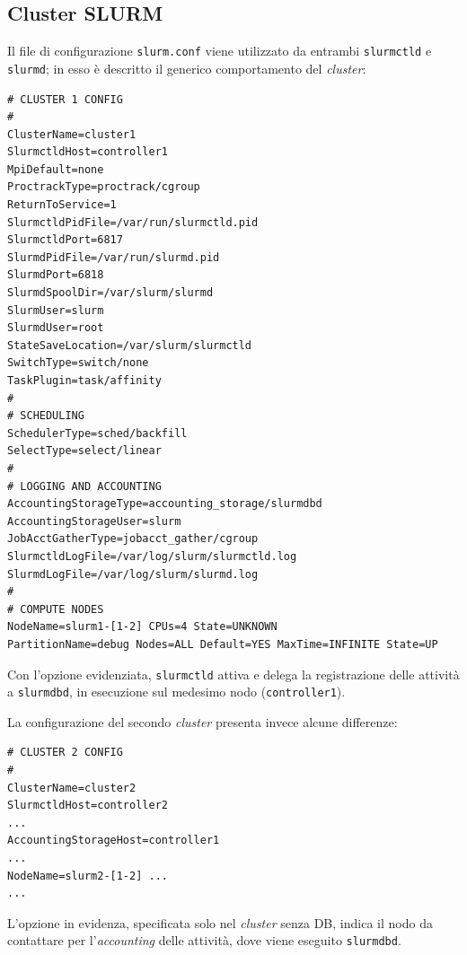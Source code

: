 \documentclass[12pt,a4paper,twoside,openright]{book}
\begin{document}
\subsection{Cluster SLURM}
\label{clusterconf}
Il file di configurazione \texttt{slurm.conf} viene utilizzato da entrambi \texttt{slurmctld} e \texttt{slurmd}; in esso è descritto il generico comportamento del \textit{cluster}:
\begin{verbatim}
# CLUSTER 1 CONFIG
#
ClusterName=cluster1
SlurmctldHost=controller1
MpiDefault=none
ProctrackType=proctrack/cgroup
ReturnToService=1
SlurmctldPidFile=/var/run/slurmctld.pid
SlurmctldPort=6817
SlurmdPidFile=/var/run/slurmd.pid
SlurmdPort=6818
SlurmdSpoolDir=/var/slurm/slurmd
SlurmUser=slurm
SlurmdUser=root
StateSaveLocation=/var/slurm/slurmctld
SwitchType=switch/none
TaskPlugin=task/affinity
#
# SCHEDULING
SchedulerType=sched/backfill
SelectType=select/linear
#
# LOGGING AND ACCOUNTING
AccountingStorageType=accounting_storage/slurmdbd
AccountingStorageUser=slurm
JobAcctGatherType=jobacct_gather/cgroup
SlurmctldLogFile=/var/log/slurm/slurmctld.log
SlurmdLogFile=/var/log/slurm/slurmd.log
#
# COMPUTE NODES
NodeName=slurm1-[1-2] CPUs=4 State=UNKNOWN
PartitionName=debug Nodes=ALL Default=YES MaxTime=INFINITE State=UP
\end{verbatim}
Con l'opzione evidenziata, \texttt{slurmctld} attiva e delega la registrazione delle attività a \texttt{slurmdbd}, in esecuzione sul medesimo nodo (\texttt{controller1}).

La configurazione del secondo \textit{cluster} presenta invece alcune differenze:
\begin{verbatim}
# CLUSTER 2 CONFIG
#
ClusterName=cluster2
SlurmctldHost=controller2
...
AccountingStorageHost=controller1
...
NodeName=slurm2-[1-2] ...
...
\end{verbatim}
L'opzione in evidenza, specificata solo nel \textit{cluster} senza \ac{DB}, indica il nodo da contattare per l'\textit{accounting} delle attività, dove viene eseguito \texttt{slurmdbd}.
\end{document}
